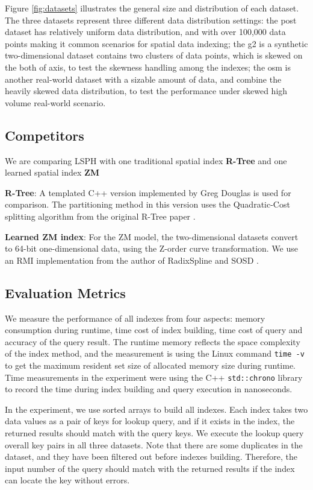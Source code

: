 Figure \ref{fig:datasets} illustrates the general size and distribution of each dataset. The three datasets represent three different data distribution settings: the post dataset has relatively uniform data distribution, and with over 100,000 data points making it common scenarios for spatial data indexing; the g2 is a synthetic two-dimensional dataset contains two clusters of data points, which is skewed on the both of axis, to test the skewness handling among the indexes; the osm is another real-world dataset with a sizable amount of data, and combine the heavily skewed data distribution, to test the performance under skewed high volume real-world scenario.  



\subsection{Competitors}
We are comparing LSPH with one traditional spatial index \textbf{R-Tree} \cite{Guttman:1984ka} and one learned spatial index \textbf{ZM} \cite{Wang:2019ks}

\textbf{R-Tree}: A templated C++ version implemented by Greg Douglas \cite{rtreecplus} is used for comparison. The partitioning method in this version uses the Quadratic-Cost splitting algorithm from the original R-Tree paper \cite{Guttman:1984ka}. 

\textbf{Learned ZM index}:  For the ZM model, the two-dimensional datasets convert to 64-bit one-dimensional data, using the Z-order curve transformation. We use an RMI implementation from the author of RadixSpline and SOSD \cite{Kipf:2020wr, sosd}. 

\subsection{Evaluation Metrics}
We measure the performance of all indexes from four aspects: memory consumption during runtime, time cost of index building, time cost of query and accuracy of the query result. The runtime memory reflects the space complexity of the index method, and the measurement is using the Linux command \texttt{time -v} to get the maximum resident set size of allocated memory size during runtime. Time measurements in the experiment were using the C++ \texttt{std::chrono} library to record the time during index building and query execution in nanoseconds. 

In the experiment, we use sorted arrays to build all indexes. Each index takes two data values as a pair of keys for lookup query, and if it exists in the index, the returned results should match with the query keys. We execute the lookup query overall key pairs in all three datasets. Note that there are some duplicates in the dataset, and they have been filtered out before indexes building. Therefore, the input number of the query should match with the returned results if the index can locate the key without errors. 



